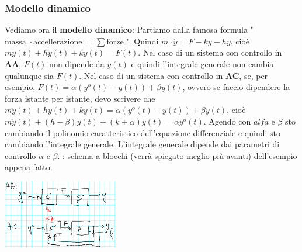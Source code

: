 \subsubsection*{Modello dinamico}
Vediamo ora il \textbf{modello dinamico}:
Partiamo dalla famosa formula "$\text{massa}\; \cdot \text{accellerazione}\; = \sum \text{forze}\;$".\newline
Quindi $m \cdot \ddot{y} = F - ky - h \dot{y}$, cioè $m \ddot{y}(t) + h \dot{y}(t) + k y(t) = F(t)$.\newline
\newline
Nel caso di un sistema con controllo in \textbf{AA}, $F(t)$ non dipende da $y(t)$ e quindi l'integrale generale non cambia qualunque sia $F(t)$.\newline
\newline
Nel caso di un sistema con controllo in \textbf{AC}, se, per esempio, $F(t) = \alpha(y^o(t) -y(t)) + \beta \dot{y}(t)$, ovvero se faccio dipendere la forza istante per istante, devo scrivere che $m \ddot{y}(t) + h \dot{y}(t) + k y(t) = \alpha(y^o(t) - y(t) ) + \beta \dot{y}(t)$, cioè $m \ddot{y}(t) + (h - \beta) \dot{y}(t) + (k + \alpha)y(t) = \alpha y^o(t)$. Agendo con $alfa$ e $\beta$ sto cambiando il polinomio caratteristico dell'equazione differenziale e quindi sto cambiando l'integrale generale. L'integrale generale dipende dai parametri di controllo $\alpha$ e $\beta$.\newline
{}: schema a blocchi (verrà spiegato meglio più avanti) dell'esempio appena fatto.
\begin{center}
    \includegraphics[height=3cm]{../lezione1/img7.PNG}
\end{center}